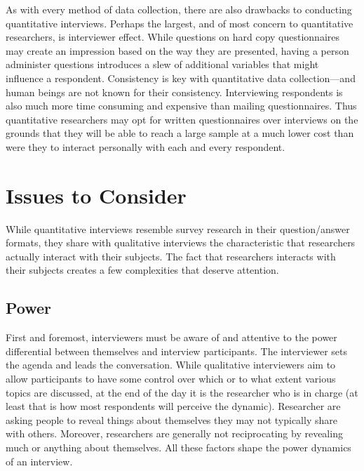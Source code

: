 As with every method of data collection, there are also drawbacks to conducting quantitative interviews. Perhaps the largest, and of most concern to quantitative researchers, is interviewer effect. While questions on hard copy questionnaires may create an impression based on the way they are presented, having a person administer questions introduces a slew of additional variables that might influence a respondent. Consistency is key with quantitative data collection---and human beings are not known for their consistency. Interviewing respondents is also much more time consuming and expensive than mailing questionnaires. Thus quantitative researchers may opt for written questionnaires over interviews on the grounds that they will be able to reach a large sample at a much lower cost than were they to interact personally with each and every respondent.

\section{Issues to Consider}

While quantitative interviews resemble survey research in their question/answer formats, they share with qualitative interviews the characteristic that researchers actually interact with their subjects. The fact that researchers interacts with their subjects creates a few complexities that deserve attention.

\subsection{Power}

First and foremost, interviewers must be aware of and attentive to the power differential between themselves and interview participants. The interviewer sets the agenda and leads the conversation. While qualitative interviewers aim to allow participants to have some control over which or to what extent various topics are discussed, at the end of the day it is the researcher who is in charge (at least that is how most respondents will perceive the dynamic). Researcher are asking people to reveal things about themselves they may not typically share with others. Moreover, researchers are generally not reciprocating by revealing much or anything about themselves. All these factors shape the power dynamics of an interview.

